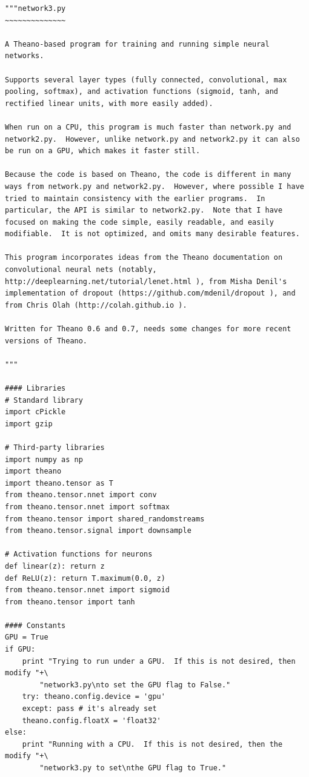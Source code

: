 \begin{lstlisting}
"""network3.py
~~~~~~~~~~~~~~

A Theano-based program for training and running simple neural
networks.

Supports several layer types (fully connected, convolutional, max
pooling, softmax), and activation functions (sigmoid, tanh, and
rectified linear units, with more easily added).

When run on a CPU, this program is much faster than network.py and
network2.py.  However, unlike network.py and network2.py it can also
be run on a GPU, which makes it faster still.

Because the code is based on Theano, the code is different in many
ways from network.py and network2.py.  However, where possible I have
tried to maintain consistency with the earlier programs.  In
particular, the API is similar to network2.py.  Note that I have
focused on making the code simple, easily readable, and easily
modifiable.  It is not optimized, and omits many desirable features.

This program incorporates ideas from the Theano documentation on
convolutional neural nets (notably,
http://deeplearning.net/tutorial/lenet.html ), from Misha Denil's
implementation of dropout (https://github.com/mdenil/dropout ), and
from Chris Olah (http://colah.github.io ).

Written for Theano 0.6 and 0.7, needs some changes for more recent
versions of Theano.

"""

#### Libraries
# Standard library
import cPickle
import gzip

# Third-party libraries
import numpy as np
import theano
import theano.tensor as T
from theano.tensor.nnet import conv
from theano.tensor.nnet import softmax
from theano.tensor import shared_randomstreams
from theano.tensor.signal import downsample

# Activation functions for neurons
def linear(z): return z
def ReLU(z): return T.maximum(0.0, z)
from theano.tensor.nnet import sigmoid
from theano.tensor import tanh

#### Constants
GPU = True
if GPU:
    print "Trying to run under a GPU.  If this is not desired, then modify "+\
        "network3.py\nto set the GPU flag to False."
    try: theano.config.device = 'gpu'
    except: pass # it's already set
    theano.config.floatX = 'float32'
else:
    print "Running with a CPU.  If this is not desired, then the modify "+\
        "network3.py to set\nthe GPU flag to True."


\end{lstlisting}
